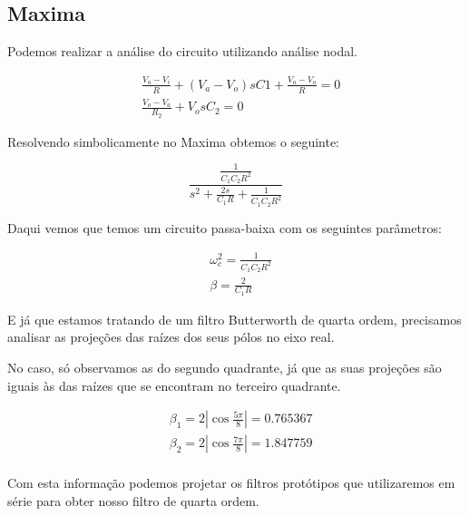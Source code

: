 \documentclass[12pt,twoside, a4paper, twocolumn]{article}
\begin{document}
\pagebreak


\subsection{Maxima}


Podemos realizar a análise do circuito utilizando análise nodal.




\begin{equation}
    \begin{aligned}
         & \frac{V_a - V_i}{R} + \left(V_a - V_o\right) s C1 + \frac{V_a - V_o}{R} = 0 \\
         & \frac{V_o - V_a}{R_2} + V_o s C_2 = 0
    \end{aligned}
\end{equation}


Resolvendo simbolicamente no Maxima obtemos o seguinte:


\begin{equation}
    \frac{\frac{1}{C_1 C_2 R^2}}{s^2 + \frac{2s}{C_1 R} + \frac{1}{C_1 C_2 R^2}}
\end{equation}


Daqui vemos que temos um circuito passa-baixa com os seguintes parâmetros:


\begin{equation}
    \begin{aligned}
         & \omega_c^2 = \frac{1}{C_1 C_2 R^2} \\
         & \beta = \frac{2}{C_1 R}
    \end{aligned}
\end{equation}


E já que estamos tratando de um filtro Butterworth de quarta ordem, precisamos analisar as projeções das raízes dos seus pólos no eixo real.


No caso, só observamos as do segundo quadrante, já que as suas projeções são iguais às das raízes que se encontram no terceiro quadrante.


\begin{equation}
    \begin{aligned}
         & \beta_1 = 2 \left| \cos{\frac{5 \pi}{8}} \right| = 0.765367 \\
         & \beta_2 = 2 \left| \cos{\frac{7 \pi}{8}}\right| = 1.847759  \\
    \end{aligned}
\end{equation}


Com esta informação podemos projetar os filtros protótipos que utilizaremos em série para obter nosso filtro de quarta ordem.
\end{document}
